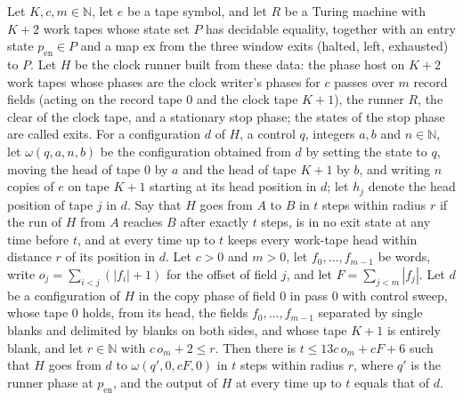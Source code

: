 \begin{lemma}
\label{Turing.cw_writer}
\leanok
{}
Let $K,c,m\in\mathbb{N}$, let $e$ be a tape symbol, and let $R$ be a Turing machine with $K+2$
work tapes whose state set $P$ has decidable equality, together with an entry state
$p_{\mathrm{en}}\in P$ and a map $\mathrm{ex}$ from the three window exits (halted, left,
exhausted) to $P$. Let $H$ be the clock runner built from these data: the phase host on $K+2$
work tapes whose phases are the clock writer's phases for $c$ passes over $m$ record fields
(acting on the record tape $0$ and the clock tape $K+1$), the runner $R$, the clear of the
clock tape, and a stationary stop phase; the states of the stop phase are called exits. For a
configuration $d$ of $H$, a control $q$, integers $a,b$ and $n\in\mathbb{N}$, let
$\omega(q,a,n,b)$ be the configuration obtained from $d$ by setting the state to $q$, moving
the head of tape $0$ by $a$ and the head of tape $K+1$ by $b$, and writing $n$ copies of $e$ on
tape $K+1$ starting at its head position in $d$; let $h_j$ denote the head position of tape $j$
in $d$. Say that $H$ goes from $A$ to $B$ in $t$ steps within radius $r$ if the run of $H$ from
$A$ reaches $B$ after exactly $t$ steps, is in no exit state at any time before $t$, and at
every time up to $t$ keeps every work-tape head within distance $r$ of its position in $d$. Let
$c>0$ and $m>0$, let $f_0,\dots,f_{m-1}$ be words, write $o_j=\sum_{i<j}(|f_i|+1)$ for the
offset of field $j$, and let $F=\sum_{j<m}|f_j|$. Let $d$ be a configuration of $H$ in the copy
phase of field $0$ in pass $0$ with control sweep, whose tape $0$ holds, from its head, the
fields $f_0,\dots,f_{m-1}$ separated by single blanks and delimited by blanks on both sides,
and whose tape $K+1$ is entirely blank, and let $r\in\mathbb{N}$ with $c\,o_m+2\le r$. Then
there is $t\le 13c\,o_m+cF+6$ such that $H$ goes from $d$ to $\omega(q',0,cF,0)$ in $t$ steps
within radius $r$, where $q'$ is the runner phase at $p_{\mathrm{en}}$, and the output of $H$
at every time up to $t$ equals that of $d$.
\end{lemma}

